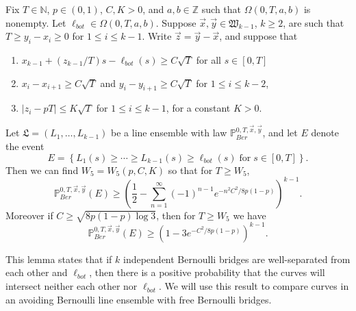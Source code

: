 \begin{lemma}\label{CurveSeparation} Fix $T\in\mathbb{N}$, $p\in (0,1)$, $C,K>0$, and $a,b\in \mathbb{Z}$ such that $\Omega(0,T,a,b)$ is nonempty. Let $\ell_{bot} \in \Omega(0,T,a,b)$. Suppose $\vec{x},\vec{y}\in\mathfrak{W}_{k-1}$, $k\geq 2$, are such that $T \geq y_i - x_i \geq 0$ for $1\leq i\leq k-1$. Write $\vec{z} = \vec{y} - \vec{x}$, and suppose that
	\begin{enumerate}[label=(\arabic*)]
		
		\item $x_{k-1} + (z_{k-1}/T)s - \ell_{bot}(s) \geq C\sqrt{T}$ for all $s\in[0,T]$
		
		\item $x_i - x_{i+1} \geq C\sqrt{T}$ and $y_i - y_{i+1} \geq C\sqrt{T}$ for $1\leq i\leq k-2$,
		
		\item $|z_i - pT| \leq K\sqrt{T}$ for $1\leq i\leq k-1$, for a constant $K > 0$.
		
	\end{enumerate}
	Let $\mathfrak{L} = (L_1,\dots,L_{k-1})$ be a line ensemble with law $\mathbb{P}^{0,T,\vec{x},\vec{y}}_{Ber}$, and let $E$ denote the event 
	\[ E=\left\{L_1(s)\geq \cdots \geq L_{k-1}(s)\geq \ell_{bot}(s) \; \mathrm{for} \; s\in [0,T]\right\}.
	\] 
	Then we can find $W_5 = W_5(p,C,K)$ so that for $T\geq W_5$,
	\begin{equation}\label{SepBound1}
	\mathbb{P}^{0,T,\vec{x},\vec{y}}_{Ber}(E) \geq \left(\frac{1}{2} - \sum_{n=1}^\infty (-1)^{n-1} e^{-n^2C^2/8p(1-p)}\right)^{k-1}.
	\end{equation}
	Moreover if $C \geq \sqrt{8p(1-p)\log 3}$, then for $T\geq W_5$ we have
	\begin{equation}\label{SepBound2}
	\mathbb{P}^{0,T,\vec{x},\vec{y}}_{Ber}(E) \geq \left(1 - 3e^{-C^2/8p(1-p)}\right)^{k-1}.
	\end{equation}
\end{lemma}

\begin{remark}
	This lemma states that if $k$ independent Bernoulli bridges are well-separated from each other and $\ell_{bot}$, then there is a positive probability that the curves will intersect neither each other nor $\ell_{bot}$. We will use this result to compare curves in an avoiding Bernoulli line ensemble with free Bernoulli bridges.
\end{remark}


